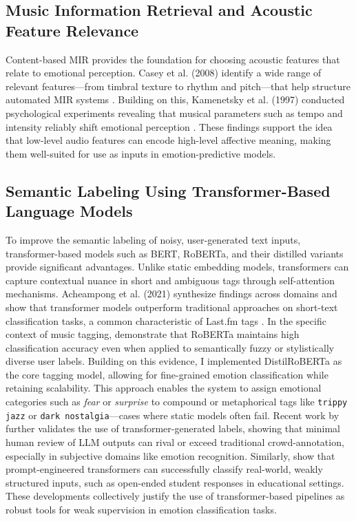 \documentclass{article}
\begin{document}
\subsection{Music Information Retrieval and Acoustic Feature Relevance}

Content-based MIR provides the foundation for choosing acoustic features that relate to emotional perception. Casey et al. (2008) identify a wide range of relevant features—from timbral texture to rhythm and pitch—that help structure automated MIR systems \parencite{Casey2008}. Building on this, Kamenetsky et al. (1997) conducted psychological experiments revealing that musical parameters such as tempo and intensity reliably shift emotional perception \parencite{Kamenetsky1997}. These findings support the idea that low-level audio features can encode high-level affective meaning, making them well-suited for use as inputs in emotion-predictive models.

\subsection{Semantic Labeling Using Transformer-Based Language Models}

To improve the semantic labeling of noisy, user-generated text inputs, transformer-based models such as BERT, RoBERTa, and their distilled variants provide significant advantages. Unlike static embedding models, transformers can capture contextual nuance in short and ambiguous tags through self-attention mechanisms. Acheampong et al. (2021) synthesize findings across domains and show that transformer models outperform traditional approaches on short-text classification tasks, a common characteristic of Last.fm tags \parencite{Acheampong2021}. In the specific context of music tagging, \textcite{Olha2023} demonstrate that RoBERTa maintains high classification accuracy even when applied to semantically fuzzy or stylistically diverse user labels. Building on this evidence, I implemented DistilRoBERTa as the core tagging model, allowing for fine-grained emotion classification while retaining scalability. This approach enables the system to assign emotional categories such as \textit{fear} or \textit{surprise} to compound or metaphorical tags like \texttt{trippy jazz} or \texttt{dark nostalgia}—cases where static models often fail. Recent work by \textcite{Artemova2025} further validates the use of transformer-generated labels, showing that minimal human review of LLM outputs can rival or exceed traditional crowd-annotation, especially in subjective domains like emotion recognition. Similarly, \textcite{Kim2024} show that prompt-engineered transformers can successfully classify real-world, weakly structured inputs, such as open-ended student responses in educational settings. These developments collectively justify the use of transformer-based pipelines as robust tools for weak supervision in emotion classification tasks.
\end{document}
